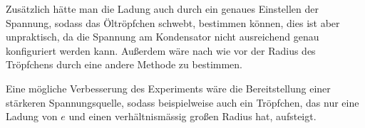 \documentclass[
	a4paper,
	12pt,
	pagesize,
	ngerman
]{scrartcl}
\begin{document}
	Zusätzlich hätte man die Ladung auch durch ein genaues Einstellen der Spannung, sodass das Öltröpfchen schwebt, bestimmen können, dies ist aber unpraktisch, da die Spannung am Kondensator nicht ausreichend genau konfiguriert werden kann.
	Außerdem wäre nach wie vor der Radius des Tröpfchens durch eine andere Methode zu bestimmen.


	Eine mögliche Verbesserung des Experiments wäre die Bereitstellung einer stärkeren Spannungsquelle, sodass beispielweise auch ein Tröpfchen, das nur eine Ladung von $e$ und einen verhältnismässig großen Radius hat, aufsteigt.

	

	\printbibliography
\end{document}
